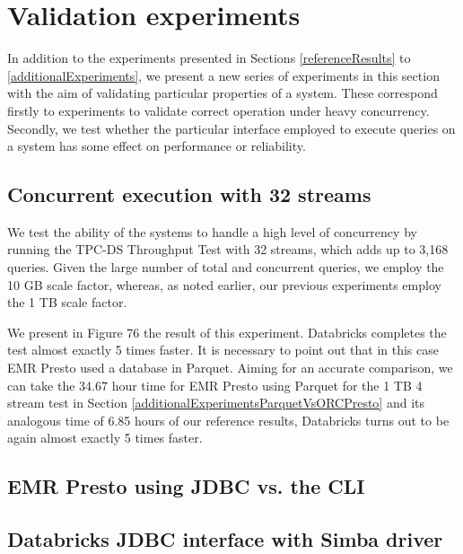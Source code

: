 \section{Validation experiments}\label{validationExperiments}

In addition to the experiments presented in Sections \ref{referenceResults} to \ref{additionalExperiments}, we present a new series of experiments in this section with the aim of validating particular properties of a system. These correspond firstly to experiments to validate correct operation under heavy concurrency. Secondly, we test whether the particular interface employed to execute queries on a system has some effect on performance or reliability.

\subsection{Concurrent execution with 32 streams}\label{concurrent32streams}

We test the ability of the systems to handle a high level of concurrency by running the TPC-DS Throughput Test with 32 streams, which adds up to 3,168 queries. Given the large number of total and concurrent queries, we employ the 10 GB scale factor, whereas, as noted earlier, our previous experiments employ the 1 TB scale factor.

We present in Figure 76 the result of this experiment. Databricks completes the test almost exactly 5 times faster. It is necessary to point out that in this case EMR Presto used a database in Parquet. Aiming for an accurate comparison, we can take the 34.67 hour time for EMR Presto using Parquet for the 1 TB 4 stream test in Section \ref{additionalExperimentsParquetVsORCPresto} and its analogous time of 6.85 hours of our reference results, Databricks turns out to be again almost exactly 5 times faster.

\subsection{EMR Presto using JDBC vs. the CLI}\label{prestoJDBvsCLI}

\subsection{Databricks JDBC interface with Simba driver}\label{databricksJDBC}